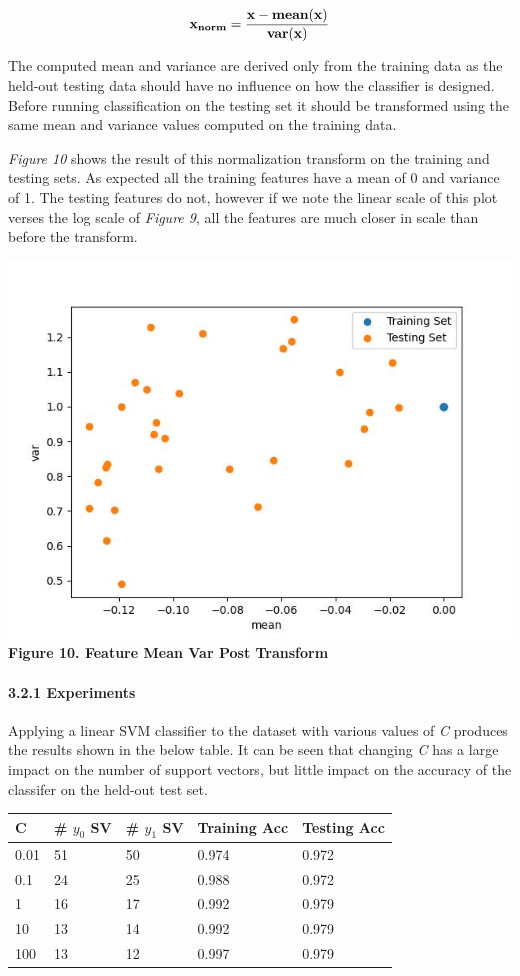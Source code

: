 \documentclass[11pt]{article}
\begin{document}
\[
\bf{x_{norm}} = \frac{\bf{x} - mean(\bf{x})}{var(\bf{x})}
\]

The computed mean and variance are derived only from the training data
as the held-out testing data should have no influence on how the
classifier is designed. Before running classification on the testing set
it should be transformed using the same mean and variance values
computed on the training data.

\emph{Figure 10} shows the result of this normalization transform on the
training and testing sets. As expected all the training features have a
mean of 0 and variance of 1. The testing features do not, however if we
note the linear scale of this plot verses the log scale of \emph{Figure
9}, all the features are much closer in scale than before the transform.

\includegraphics{figures/3_2_mean_var.jpg}\\
\textbf{Figure 10. Feature Mean Var Post Transform}

\hypertarget{experiments}{%
\paragraph{3.2.1 Experiments}\label{experiments}}

Applying a linear SVM classifier to the dataset with various values of
\emph{C} produces the results shown in the below table. It can be seen
that changing \emph{C} has a large impact on the number of support
vectors, but little impact on the accuracy of the classifer on the
held-out test set.

\begin{longtable}[]{@{}lllll@{}}
\toprule
C & \# \(y_{0}\) SV & \# \(y_{1}\) SV & Training Acc & Testing Acc \\
\midrule
\endhead
0.01 & 51 & 50 & 0.974 & 0.972 \\
0.1 & 24 & 25 & 0.988 & 0.972 \\
1 & 16 & 17 & 0.992 & 0.979 \\
10 & 13 & 14 & 0.992 & 0.979 \\
100 & 13 & 12 & 0.997 & 0.979 \\
\bottomrule
\end{longtable}
\end{document}
